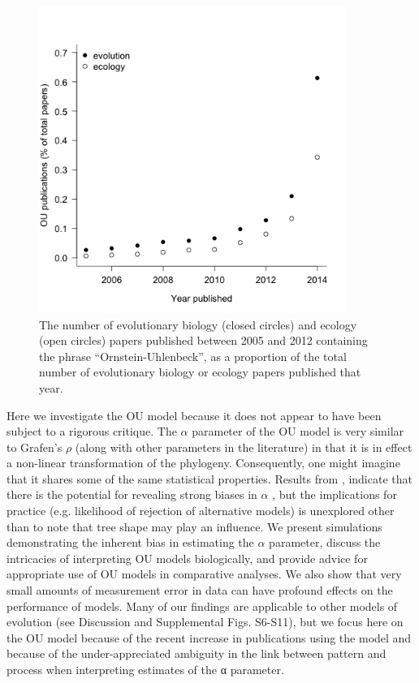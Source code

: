 \documentclass[a4paper,12pt]{article}
\begin{document}
    \begin{figure}
      \centering
      \includegraphics[width=10cm, height=10cm, keepaspectratio=true]{Figures/PapersThruTime.png}
      \caption{The number of evolutionary biology (closed circles) and ecology (open circles) papers published between 2005 and 2012 containing the phrase “Ornstein-Uhlenbeck”, as a proportion of the total number of evolutionary biology or ecology papers published that year.}
      \label{figure.literature}
    \end{figure}

Here we investigate the OU model because it does not appear to have been subject to a rigorous critique. 
The $\alpha$ parameter of the OU model is very similar to Grafen’s $\rho$ (along with other parameters in the literature) in that it is in effect a non-linear transformation of the phylogeny. 
Consequently, one might imagine that it shares some of the same statistical properties. 
Results from \citet{ho2013asymptotic}, indicate that there is the potential for revealing strong biases in $\alpha$ , but the implications for practice (e.g. likelihood of rejection of alternative models) is unexplored other than to note that tree shape may play an influence. 
We present simulations demonstrating the inherent bias in estimating the $\alpha$ parameter, discuss the intricacies of interpreting OU models biologically, and provide advice for appropriate use of OU models in comparative analyses. We also show that very small amounts of measurement error in data can have profound effects on the performance of models. 
Many of our findings are applicable to other models of evolution (see Discussion and Supplemental Figs. S6-S11), but we focus here on the OU model because of the recent increase in publications using the model and because of the under-appreciated ambiguity in the link between pattern and process when interpreting estimates of the α parameter. 
\end{document}
